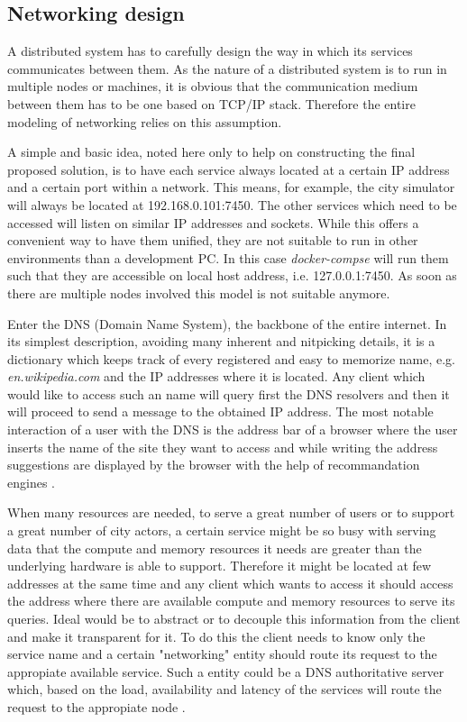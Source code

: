 \documentclass[conference]{IEEEtran}
\begin{document}
\subsection{Networking design}
\label{subsec:networking}

A distributed system has to carefully design the way in which its services communicates between them. As the nature of a distributed system is to run in multiple nodes or machines, it is obvious that the communication medium between them has to be one based on TCP/IP stack. Therefore the entire modeling of networking relies on this assumption.

A simple and basic idea, noted here only to help on constructing the final proposed solution, is to have each service always located at a certain IP address and a certain port within a network. This means, for example, the city simulator will always be located at 192.168.0.101:7450. The other services which need to be accessed will listen on similar IP addresses and sockets. While this offers a convenient way to have them unified, they are not suitable to run in other environments than a development PC. In this case \textit{docker-compse} will run them such that they are accessible on local host address, i.e. 127.0.0.1:7450. As soon as there are multiple nodes involved this model is not suitable anymore.

Enter the DNS (Domain Name System), the backbone of the entire internet. In its simplest description, avoiding many inherent and nitpicking details, it is a dictionary which keeps track of every registered and easy to memorize name, e.g. \textit{en.wikipedia.com} and the IP addresses where it is located. Any client which would like to access such an name will query first the DNS resolvers and then it will proceed to send a message to the obtained IP address. The most notable interaction of a user with the DNS is the address bar of a browser where the user inserts the name of the site they want to access and while writing the address suggestions are displayed by the browser with the help of recommandation engines \citep{risley2001domain}.

When many resources are needed, to serve a great number of users or to support a great number of city actors, a certain service might be so busy with serving data that the compute and memory resources it needs are greater than the underlying hardware is able to support. Therefore it might be located at few addresses at the same time and any client which wants to access it should access the address where there are available compute and memory resources to serve its queries. Ideal would be to abstract or to decouple this information from the client and make it transparent for it. To do this the client needs to know only the service name and a certain "networking" entity should route its request to the appropiate available service. Such a entity could be a DNS authoritative server which, based on the load, availability and latency of the services will route the request to the appropiate node \citep{swildens2006scalable}.
\end{document}
